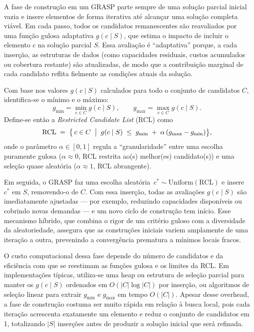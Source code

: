 \documentclass[a4paper, 12pt]{article}
\begin{document}
A fase de construção em um GRASP parte sempre de uma solução parcial inicial vazia e insere elementos de forma iterativa até alcançar uma solução completa viável. Em cada passo, todos os candidatos remanescentes são reavaliados por uma função gulosa adaptativa \(g(c \mid S)\), que estima o impacto de incluir o elemento \(c\) na solução parcial \(S\). Essa avaliação é “adaptativa” porque, a cada inserção, as estruturas de dados (como capacidades residuais, custos acumulados ou cobertura restante) são atualizadas, de modo que a contribuição marginal de cada candidato reflita fielmente as condições atuais da solução.

Com base nos valores \(g(c \mid S)\) calculados para todo o conjunto de candidatos \(C\), identifica-se o mínimo e o máximo:
\[
g_{\min} = \min_{c\in C} g(c \mid S),
\qquad
g_{\max} = \max_{c\in C} g(c \mid S).
\]
Define-se então a \emph{Restricted Candidate List} (RCL) como
\[
\mathrm{RCL} \;=\; \bigl\{\,c\in C \;\bigm|\; g(c \mid S) \;\le\; g_{\min} \;+\;\alpha\,(g_{\max}-g_{\min})\bigr\},
\]
onde o parâmetro \(\alpha\in[0,1]\) regula a “granularidade” entre uma escolha puramente gulosa (\(\alpha\approx 0\), RCL restrita ao(s) melhor(es) candidato(s)) e uma seleção quase aleatória (\(\alpha\approx 1\), RCL abrangente).

Em seguida, o GRASP faz uma escolha aleatória \(\,c^*\sim\mathrm{Uniform}(\mathrm{RCL})\) e insere \(c^*\) em \(S\), removendo-o de \(C\). Com essa inserção, todas as avaliações \(g(c \mid S)\) são imediatamente ajustadas — por exemplo, reduzindo capacidades disponíveis ou cobrindo novas demandas — e um novo ciclo de construção tem início. Esse mecanismo híbrido, que combina o rigor de um critério guloso com a diversidade da aleatoriedade, assegura que as construções iniciais variem amplamente de uma iteração a outra, prevenindo a convergência prematura a mínimos locais fracos.

O custo computacional dessa fase depende do número de candidatos e da eficiência com que se reestimam as funções gulosa e os limites da RCL. Em implementações típicas, utiliza-se uma heap ou estrutura de seleção parcial para manter os \(g(c \mid S)\) ordenados em \(O(\lvert C\rvert \log \lvert C\rvert)\) por inserção, ou algoritmos de seleção linear para extrair \(g_{\min}\) e \(g_{\max}\) em tempo \(O(\lvert C\rvert)\). Apesar desse overhead, a fase de construção costuma ser muito rápida em relação à busca local, pois cada iteração acrescenta exatamente um elemento e reduz o conjunto de candidatos em 1, totalizando \(\lvert S\rvert\) inserções antes de produzir a solução inicial que será refinada.
\end{document}
